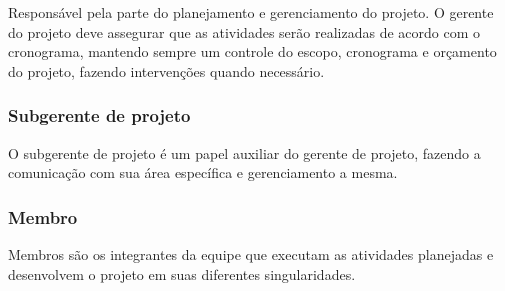     Responsável pela parte do planejamento e gerenciamento do projeto.
    O gerente do projeto deve assegurar que as atividades serão realizadas
    de acordo com o cronograma, mantendo sempre um controle do escopo, cronograma
    e orçamento do projeto, fazendo intervenções quando necessário.

    \subsubsection{Subgerente de projeto}

    O subgerente de projeto é um papel auxiliar do gerente de projeto, fazendo
    a comunicação com sua área específica e gerenciamento a mesma.

    \subsubsection{Membro}

    Membros são os integrantes da equipe que executam as atividades planejadas
    e desenvolvem o projeto em suas diferentes singularidades.
